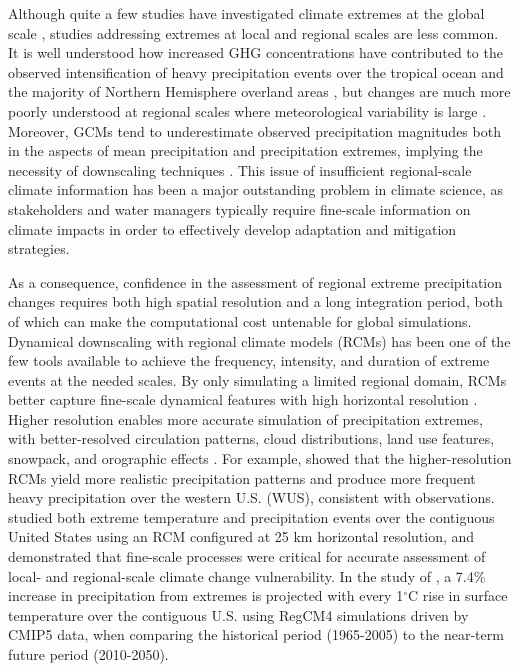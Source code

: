 \documentclass{ametsoc}
\begin{document}
Although quite a few studies have investigated climate extremes at the global scale \citep{seneviratne2012changes}, studies addressing extremes at local and regional scales are less common.  It is well understood how increased GHG concentrations have contributed to the observed intensification of heavy precipitation events over the tropical ocean \citep{allan2008atmospheric} and the majority of Northern Hemisphere overland areas \citep{min2011human}, but changes are much more poorly understood at regional scales where meteorological variability is large \citep{trenberth2011changes}. Moreover, GCMs tend to underestimate observed precipitation magnitudes both in the aspects of mean precipitation and precipitation extremes, implying the necessity of downscaling techniques \citep{sillmann2013evaluation}. This issue of insufficient regional-scale climate information has been a major outstanding problem in climate science, as stakeholders and water managers typically require fine-scale information on climate impacts in order to effectively develop adaptation and mitigation strategies.

As a consequence, confidence in the assessment of regional extreme precipitation changes requires both high spatial resolution and a long integration period, both of which can make the computational cost untenable for global simulations. Dynamical downscaling with regional climate models (RCMs) has been one of the few tools available to achieve the frequency, intensity, and duration of extreme events at the needed scales.  By only simulating a limited regional domain, RCMs better capture fine-scale dynamical features with high horizontal resolution \citep{bell2004regional, frei2006future, rauscher2010resolution, wehner2013very}. Higher resolution enables more accurate simulation of precipitation extremes, with better-resolved circulation patterns, cloud distributions, land use features, snowpack, and orographic effects \citep{leung2003regional, diffenbaugh2005fine, salathe2008high, wehner2010effect}. For example, \cite{leung2003hydroclimate} showed that the higher-resolution RCMs yield more realistic precipitation patterns and produce more frequent heavy precipitation over the western U.S. (WUS), consistent with observations. \cite{diffenbaugh2005fine} studied both extreme temperature and precipitation events over the contiguous United States using an RCM configured at 25 km horizontal resolution, and demonstrated that fine-scale processes were critical for accurate assessment of local- and regional-scale climate change vulnerability. In the study of \cite{ashfaq2016high}, a 7.4\% increase in precipitation from extremes is projected with every 1$^\circ$C rise in surface temperature over the contiguous U.S. using RegCM4 simulations driven by CMIP5 data, when comparing the historical period (1965-2005) to the near-term future period (2010-2050).
\end{document}
